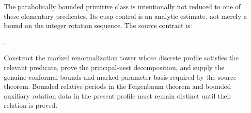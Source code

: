The parabolically bounded primitive class is intentionally not reduced to
one of these elementary predicates.  Its cusp control is an analytic
estimate, not merely a bound on the integer rotation sequence.  The source
contract is:
\begin{center}
.
\end{center}

\begin{formalobligation}
\label{est:combinatorial-realization}
Construct the marked renormalization tower whose discrete profile satisfies
the relevant predicate, prove the principal-nest decomposition, and supply
the genuine conformal bounds and marked parameter basis required by
the source theorem.  Bounded relative periods in the Feigenbaum
theorem and bounded auxiliary rotation data in the present profile
must remain distinct until their relation is proved.
\end{formalobligation}
